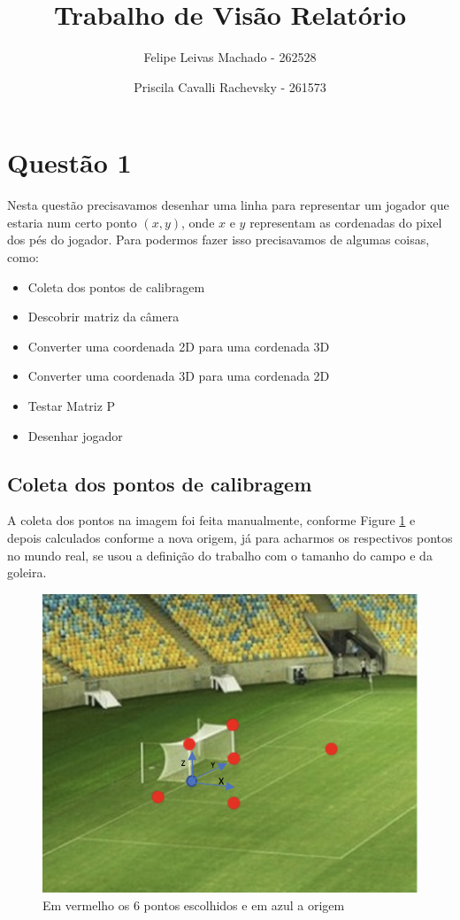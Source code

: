 \documentclass{article}
\title{Trabalho de Visão Relatório}
\author{Felipe Leivas Machado - 262528 \and Priscila Cavalli Rachevsky - 261573 }
\begin{document}
\maketitle

\section{Questão 1}
    Nesta questão precisavamos desenhar uma linha para representar um jogador que estaria num certo ponto \((x, y)\), onde \(x\) e \(y\) representam as cordenadas do pixel dos pés do jogador. Para podermos fazer isso precisavamos de algumas coisas, como:
   \begin{itemize}
       \item Coleta dos pontos de calibragem
       \item Descobrir matriz da câmera
       \item Converter uma coordenada 2D para uma cordenada 3D
       \item Converter uma coordenada 3D  para uma cordenada 2D
       \item Testar Matriz P
       \item Desenhar jogador
   \end{itemize}

    \subsection{Coleta dos pontos de calibragem}
        A coleta dos pontos na imagem foi feita manualmente, conforme Figure \ref{fig:maracana1Pontos} e depois calculados conforme a nova origem, já para acharmos os  respectivos  pontos  no  mundo  real, se usou a definição do trabalho com o tamanho do campo e da goleira.
        \begin{figure}[h!]
            \centering
            \includegraphics[scale=0.6]{maracana1Pontos.png}
            \caption{Em vermelho os 6 pontos escolhidos e em azul a origem}
            \label{fig:maracana1Pontos}
        \end{figure}
\end{document}
